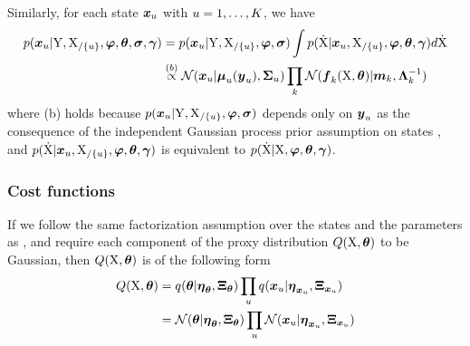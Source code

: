Similarly, for each state $\boldsymbol{x}_{u}$ with $u = 1,\dots,K$, we have
\begin{align}
    p(\boldsymbol{x}_{u}\vert\mathrm{Y},\mathrm{X}_{/\{u\}},\boldsymbol{\varphi},\boldsymbol{\theta},\boldsymbol{\sigma},\boldsymbol{\gamma})
    & = 
    p(\boldsymbol{x}_{u}\vert\mathrm{Y},\mathrm{X}_{/\{u\}},\boldsymbol{\varphi},\boldsymbol{\sigma})
    \int{
        p(\mathrm{\dot{X}}\vert\boldsymbol{x}_{u},\mathrm{X}_{/\{u\}},\boldsymbol{\ensuremath{\varphi}},\boldsymbol{\theta},\boldsymbol{\gamma})d\mathrm{\dot{X}}}
    \nonumber
    \\
    & \stackrel{(b)}{\propto}
    \mathcal{N}(\boldsymbol{x}_{u}\vert\boldsymbol{\mu}_{u}(\boldsymbol{y}_{u}),\boldsymbol{\Sigma}_{u})\prod_k{\mathcal{N}(\boldsymbol{f}_{k}(\mathrm{X}, \boldsymbol{\theta})\vert\boldsymbol{m}_{k},\boldsymbol{\Lambda}_{k}^{-1})}
    \label{eq-laplace-xu-objective}
\end{align}
where (b) holds because $p(\boldsymbol{x}_{u}\vert\mathrm{Y},\mathrm{X}_{/\{u\}},\boldsymbol{\varphi},\boldsymbol{\sigma})$ depends only on $\boldsymbol{y}_{u}$ as the consequence of the independent Gaussian process prior assumption on states , and $p(\mathrm{\dot{X}}\vert\boldsymbol{x}_{u},\mathrm{X}_{/\{u\}},\boldsymbol{\varphi},\boldsymbol{\theta},\boldsymbol{\gamma})$ is equivalent to $p(\mathrm{\dot{X}}\vert\mathrm{X},\boldsymbol{\varphi},\boldsymbol{\theta},\boldsymbol{\gamma})$.

\subsubsection*{Cost functions}

If we follow the same factorization assumption over the states and the parameters as \cite{gorbach2017scalable}, and require each component of the proxy distribution $Q(\mathrm{X}, \boldsymbol{\theta})$ to be Gaussian, then $Q(\mathrm{X}, \boldsymbol{\theta})$ is of the following form
\begin{align}
    Q(\mathrm{X},\boldsymbol{\theta}) 
    & = 
    q(\boldsymbol{\theta}\vert\boldsymbol{\eta}_{\boldsymbol{\theta}},\boldsymbol{\Xi}_{\boldsymbol{\theta}})\prod_u{
        q(\boldsymbol{x}_{u}\vert\boldsymbol{\eta}_{\boldsymbol{x}_{u}},\boldsymbol{\Xi}_{\boldsymbol{x}_{u}})}
    \nonumber
    \\
    & = \mathcal{N}(\boldsymbol{\theta}\vert\boldsymbol{\eta}_{\boldsymbol{\theta}}, \boldsymbol{\Xi}_{\boldsymbol{\theta}})\prod_u{
        \mathcal{N}(\boldsymbol{x}_{u}\vert\boldsymbol{\eta}_{\boldsymbol{x}_{u}},\boldsymbol{\Xi}_{\boldsymbol{x}_{u}})
    }
\end{align}

